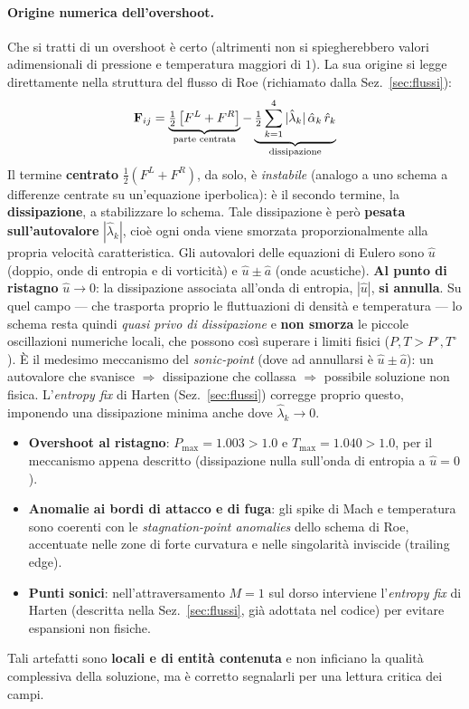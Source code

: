 \paragraph{Origine numerica dell'overshoot.}
Che si tratti di un overshoot è certo (altrimenti non si spiegherebbero valori adimensionali di
pressione e temperatura maggiori di $1$). La sua origine si legge direttamente nella struttura del
flusso di Roe (richiamato dalla Sez.~\ref{sec:flussi}):
\begin{equation}
  \mathbf{F}_{ij} = \underbrace{\tfrac{1}{2}\left[F^L + F^R\right]}_{\text{parte centrata}}
               - \underbrace{\tfrac{1}{2} \sum_{k=1}^{4} |\hat{\lambda}_k|\,\hat{\alpha}_k\,\hat{r}_k}_{\text{dissipazione}}
  \label{eq:roe_overshoot}
\end{equation}
Il termine \textbf{centrato} $\tfrac{1}{2}(F^L+F^R)$, da solo, è \emph{instabile} (analogo a uno
schema a differenze centrate su un'equazione iperbolica): è il secondo termine, la
\textbf{dissipazione}, a stabilizzare lo schema. Tale dissipazione è però \textbf{pesata
sull'autovalore} $|\hat{\lambda}_k|$, cioè ogni onda viene smorzata proporzionalmente alla propria
velocità caratteristica. Gli autovalori delle equazioni di Eulero sono $\hat u$ (doppio, onde di
entropia e di vorticità) e $\hat u \pm \hat a$ (onde acustiche). \textbf{Al punto di ristagno}
$\hat u \to 0$: la dissipazione associata all'onda di entropia, $|\hat u|$, \textbf{si annulla}.
Su quel campo --- che trasporta proprio le fluttuazioni di densità e temperatura --- lo schema
resta quindi \emph{quasi privo di dissipazione} e \textbf{non smorza} le piccole oscillazioni
numeriche locali, che possono così superare i limiti fisici ($P, T > P^\circ, T^\circ$). È il
medesimo meccanismo del \emph{sonic-point} (dove ad annullarsi è $\hat u \pm \hat a$): un
autovalore che svanisce $\Rightarrow$ dissipazione che collassa $\Rightarrow$ possibile
soluzione non fisica. L'\emph{entropy fix} di Harten (Sez.~\ref{sec:flussi}) corregge proprio
questo, imponendo una dissipazione minima anche dove $\hat{\lambda}_k \to 0$.

\begin{itemize}
  \item \textbf{Overshoot al ristagno}: $P_{\max} = 1.003 > 1.0$ e $T_{\max} = 1.040 > 1.0$, per
    il meccanismo appena descritto (dissipazione nulla sull'onda di entropia a $\hat u = 0$).
  \item \textbf{Anomalie ai bordi di attacco e di fuga}: gli spike di Mach e temperatura sono
    coerenti con le \emph{stagnation-point anomalies} dello schema di Roe, accentuate nelle zone
    di forte curvatura e nelle singolarità inviscide (trailing edge).
  \item \textbf{Punti sonici}: nell'attraversamento $M = 1$ sul dorso interviene l'\emph{entropy
    fix} di Harten (descritta nella Sez.~\ref{sec:flussi}, già adottata nel codice) per evitare
    espansioni non fisiche.
\end{itemize}
Tali artefatti sono \textbf{locali e di entità contenuta} e non inficiano la qualità complessiva
della soluzione, ma è corretto segnalarli per una lettura critica dei campi.

